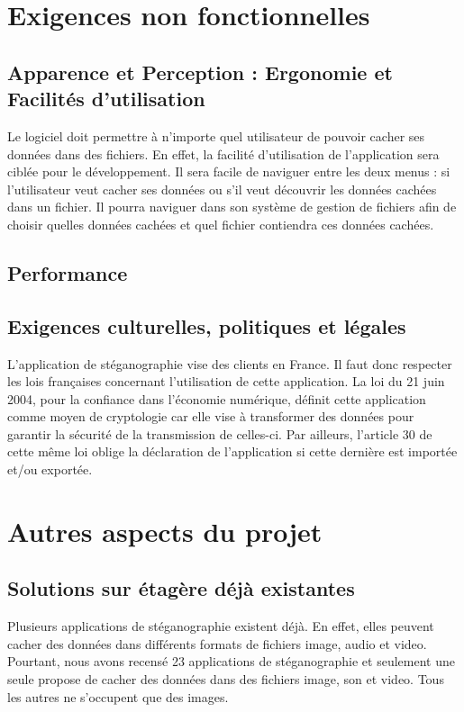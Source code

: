 \documentclass[11pt]{article}
\begin{document}
\section{Exigences non fonctionnelles}
\subsection{Apparence et Perception : Ergonomie et Facilités d'utilisation}
Le logiciel doit permettre à n'importe quel utilisateur de pouvoir cacher ses données dans des fichiers. En effet, la facilité d'utilisation de l'application sera ciblée pour le développement. 
Il sera facile de naviguer entre les deux menus : si l'utilisateur veut cacher ses données ou s'il veut découvrir les données cachées dans un fichier. 
Il pourra naviguer dans son système de gestion de fichiers afin de choisir quelles données cachées et quel fichier contiendra ces données cachées. 

\subsection{Performance}
\subsection{Exigences culturelles, politiques et légales}
L'application de stéganographie vise des clients en France. Il faut donc respecter les lois françaises concernant l'utilisation de cette application. 
La loi du 21 juin 2004, pour la confiance dans l'économie numérique, définit cette application comme moyen de cryptologie car elle vise à transformer des données pour garantir la sécurité de la transmission de celles-ci. 
Par ailleurs, l'article 30 de cette même loi oblige la déclaration de l'application si cette dernière est importée et/ou exportée. 

\section{Autres aspects du projet}
\subsection{Solutions sur étagère déjà existantes}
Plusieurs applications de stéganographie existent déjà. En effet, elles peuvent cacher des données dans différents formats de fichiers image, audio et video. 
Pourtant, nous avons recensé 23 applications de stéganographie et seulement une seule propose de cacher des données dans des fichiers image, son et video. 
Tous les autres ne s'occupent que des images. 
\end{document}
